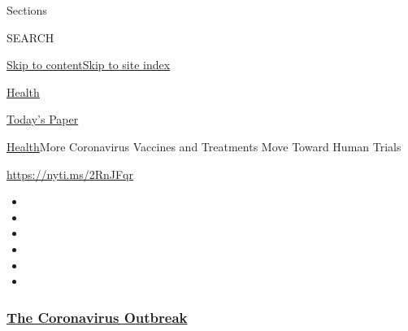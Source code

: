 Sections

SEARCH

\protect\hyperlink{site-content}{Skip to
content}\protect\hyperlink{site-index}{Skip to site index}

\href{https://www.nytimes3xbfgragh.onion/section/health}{Health}

\href{https://myaccount.nytimes3xbfgragh.onion/auth/login?response_type=cookie\&client_id=vi}{}

\href{https://www.nytimes3xbfgragh.onion/section/todayspaper}{Today's
Paper}

\href{/section/health}{Health}\textbar{}More Coronavirus Vaccines and
Treatments Move Toward Human Trials

\url{https://nyti.ms/2RnJFqr}

\begin{itemize}
\item
\item
\item
\item
\item
\item
\end{itemize}

\hypertarget{the-coronavirus-outbreak}{%
\subsubsection{\texorpdfstring{\href{https://www.nytimes3xbfgragh.onion/news-event/coronavirus?name=styln-coronavirus-national\&region=TOP_BANNER\&block=storyline_menu_recirc\&action=click\&pgtype=Article\&impression_id=2427c390-efbb-11ea-b4bc-89fe1dc99e22\&variant=undefined}{The
Coronavirus
Outbreak}}{The Coronavirus Outbreak}}\label{the-coronavirus-outbreak}}

